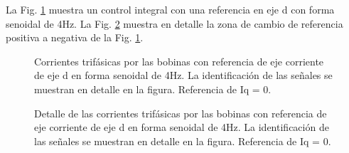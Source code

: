 \documentclass{report}
\begin{document}
La Fig. \ref{fig.20191219_141657_180} muestra un control integral con una referencia en eje d con forma senoidal de 4Hz. La Fig. \ref{fig.20191219_141721_551} muestra en detalle la zona de cambio de referencia positiva a negativa de la Fig. \ref{fig.20191219_141657_180}.

\begin{figure}[h]
    \begin{center}
    \resizebox{9cm}{!}{\texttt{[image: 20191219\_141657\_180]}}
    \caption{Corrientes trifásicas por las bobinas con referencia de eje corriente de eje d en forma senoidal de 4Hz.  La identificación de las señales se muestran en detalle en la figura. Referencia de Iq = 0.} \label{fig.20191219_141657_180}
    \end{center}
\end{figure} 

\begin{figure}[!h]
    \begin{center}
    \resizebox{9cm}{!}{\texttt{[image: 20191219\_141721\_551]}}
    \caption{Detalle de las corrientes trifásicas por las bobinas con referencia de eje corriente de eje d en forma senoidal de 4Hz. La identificación de las señales se muestran en detalle en la figura. Referencia de Iq = 0.}\label{fig.20191219_141721_551}
    \end{center}
\end{figure} 
\begin{comment}

\begin{table}[!h]
    \begin{minipage}{\textwidth}
    \begin{center}
    \begin{tabular}{|c|c|c|c|c|c|} \hline\hline\hline
    Canal & Color & Elemento & Amplitud (V) & Nº Espiras & Amperaje (A) \\ \hline
    1 & Amarillo & $I_{a}$ & 3.64 & 1 & 3.64\\ \hline
    2 & Verde & $I_{b}$ & 3.23 & 1 & 3.23\\ \hline   
    3 & Rosa & $I_{c}$ & 3.65 & 1 & 3.65\\ \hline
    4 & Azul Claro & $I_{d}$ & 0.705 & - & 1.153 \footnotetext[1]{Aplicando  (\ref{eq.equivalenciacorrientedqreal}) de la página \pageref{eq.equivalenciacorrientedqreal}} \\ \hline
    5 \footnotetext[2]{Solo representa cuando se aplica el escalón, no el valor del escalón en si.} & Rojo & $I_{d}^{ref}$ & - & - & 1.25 \\ \hline
    \end{tabular}
    \end{center}
    \caption{Tabla con los datos de la Fig. \ref{fig.20191219_141657_180}) con las corrientes trifásicas con seguimiento de referencia senoidal.} \label{tab.20191219_141657_180}
\end{minipage}
\end{table}
\end{comment}
\clearpage
\end{document}
